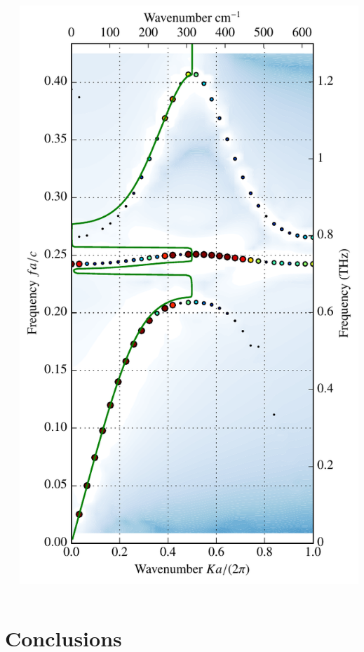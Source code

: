 \documentclass[t]{beamer} \usepackage[english]{babel} \usepackage[utf8]{inputenc} \usetheme{Frankfurt} %
\begin{document}
\begin{frame}[plain]{}
\begin{columns}[T]
\begin{column}{.55\textwidth}
	\end{column}%
	\begin{column}{.45\textwidth}
		\vspace{-1mm}\includegraphics[height=\paperheight]{../img-cdh-new/CDH_SRRArray_18.pdf} 
	\end{column}
\end{columns}
\end{frame} 		%

\section{Conclusions}
\end{document}

